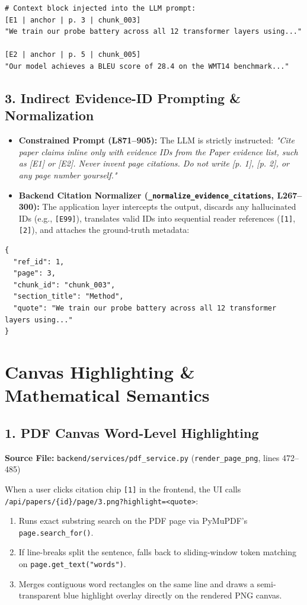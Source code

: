 \documentclass[10pt,a4paper]{article}
\begin{document}
\begin{lstlisting}
# Context block injected into the LLM prompt:
[E1 | anchor | p. 3 | chunk_003]
"We train our probe battery across all 12 transformer layers using..."

[E2 | anchor | p. 5 | chunk_005]
"Our model achieves a BLEU score of 28.4 on the WMT14 benchmark..."
\end{lstlisting}

\subsection{3. Indirect Evidence-ID Prompting \& Normalization}
\begin{itemize}[leftmargin=1.5em, itemsep=2pt]
    \item \textbf{Constrained Prompt (L871--905):} The LLM is strictly instructed: \textit{"Cite paper claims inline only with evidence IDs from the Paper evidence list, such as [E1] or [E2]. Never invent page citations. Do not write [p. 1], [p. 2], or any page number yourself."}
    \item \textbf{Backend Citation Normalizer (\texttt{\_normalize\_evidence\_citations}, L267--300):} The application layer intercepts the output, discards any hallucinated IDs (e.g., \texttt{[E99]}), translates valid IDs into sequential reader references (\texttt{[1]}, \texttt{[2]}), and attaches the ground-truth metadata:
\end{itemize}

\begin{lstlisting}
{
  "ref_id": 1,
  "page": 3,
  "chunk_id": "chunk_003",
  "section_title": "Method",
  "quote": "We train our probe battery across all 12 transformer layers using..."
}
\end{lstlisting}

\section{Canvas Highlighting \& Mathematical Semantics}

\subsection{1. PDF Canvas Word-Level Highlighting}
\textbf{Source File:} \texttt{backend/services/pdf\_service.py} (\texttt{render\_page\_png}, lines 472--485)

When a user clicks citation chip \texttt{[1]} in the frontend, the UI calls \texttt{/api/papers/\{id\}/page/3.png?highlight=<quote>}:
\begin{enumerate}[leftmargin=1.5em, itemsep=1pt]
    \item Runs exact substring search on the PDF page via PyMuPDF's \texttt{page.search\_for()}.
    \item If line-breaks split the sentence, falls back to sliding-window token matching on \texttt{page.get\_text("words")}.
    \item Merges contiguous word rectangles on the same line and draws a semi-transparent blue highlight overlay directly on the rendered PNG canvas.
\end{enumerate}
\end{document}
